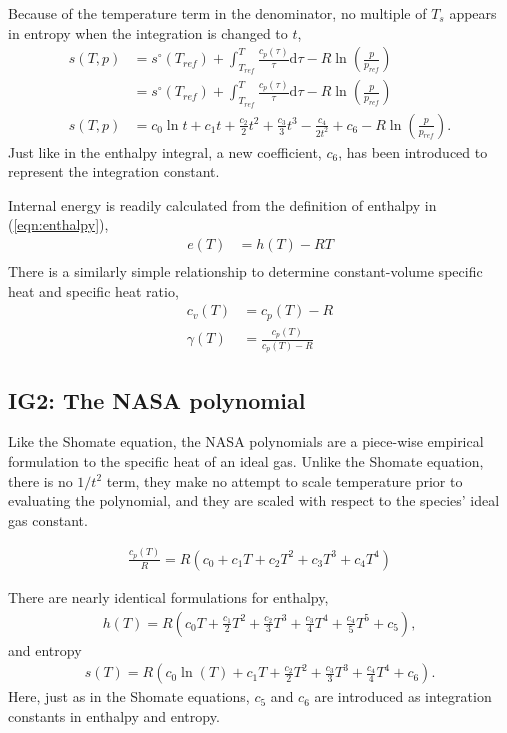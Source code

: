 \documentclass[letterpaper,11pt]{article}
\def\d{\mathrm{d}}
\begin{document}
Because of the temperature term in the denominator, no multiple of $T_s$ appears in entropy when the integration is changed to $t$,
\begin{align}
s(T,p) &= s^\circ(T_{ref}) + \int_{T_{ref}}^T \frac{c_p(\tau)}{\tau}\d \tau - R \ln \left( \frac{p}{p_{ref}} \right)\nonumber\\
 &= s^\circ(T_{ref}) + \int_{T_{ref}}^T \frac{c_p(\tau)}{\tau}\d \tau - R \ln \left( \frac{p}{p_{ref}} \right)\nonumber\\
s(T,p) &= c_0 \ln t + c_1 t + \frac{c_2}{2} t^2 + \frac{c_3}{3} t^3 -\frac{c_4}{2t^2} + c_6 - R \ln\left(\frac{p}{p_{ref}}\right).
\end{align}
Just like in the enthalpy integral, a new coefficient, $c_6$, has been introduced to represent the integration constant.

Internal energy is readily calculated from the definition of enthalpy in (\ref{eqn:enthalpy}),
\begin{align}
e(T) &= h(T) - RT\nonumber\\
\end{align}
There is a similarly simple relationship to determine constant-volume specific heat and specific heat ratio,
\begin{align}
c_v(T) &= c_p(T) - R\\
\gamma(T) &= \frac{c_p(T)}{c_p(T)-R}
\end{align}

\subsection{IG2: The NASA polynomial}

Like the Shomate equation, the NASA polynomials are a piece-wise empirical formulation to the specific heat of an ideal gas.  Unlike the Shomate equation, there is no $1/t^2$ term, they make no attempt to scale temperature prior to evaluating the polynomial, and they are scaled with respect to the species' ideal gas constant.

\begin{align}
\frac{c_p(T)}{R} = R \left(c_0 + c_1 T + c_2 T^2 + c_3 T^3 + c_4 T^4\right)
\end{align}

There are nearly identical formulations for enthalpy,
\begin{align}
h(T) = R \left(c_0 T + \frac{c_1}{2} T^2 + \frac{c_2}{3} T^3 + \frac{c_3}{4} T^4 + \frac{c_4}{5}T^5 + c_5 \right),
\end{align}
and entropy
\begin{align}
s(T) = R \left(c_0 \ln(T) + c_1 T + \frac{c_2}{2} T^2 + \frac{c_3}{3} T^3 + \frac{c_4}{4} T^4 + c_6\right).
\end{align}
Here, just as in the Shomate equations, $c_5$ and $c_6$ are introduced as integration constants in enthalpy and entropy.
\end{document}
